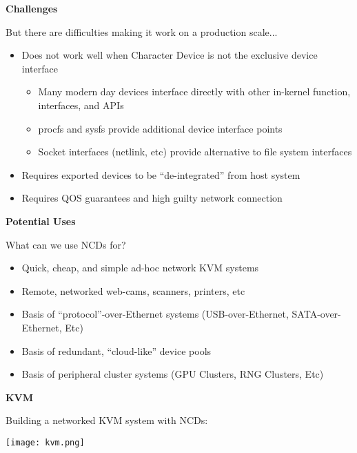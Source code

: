 \documentclass[handout]{beamer}
\begin{document}
\begin{frame}{\bf Challenges}

But there are difficulties making it work on a production scale...

\begin{itemize}
\item<1-> Does not work well when Character Device is not the exclusive
  device interface
  \begin{itemize}
  \item Many modern day devices interface directly with other
    in-kernel function, interfaces, and APIs
  \item procfs and sysfs provide additional device interface points
  \item Socket interfaces (netlink, etc) provide alternative to file
    system interfaces
  \end{itemize}
\item<2-> Requires exported devices to be ``de-integrated'' from host system
\item<3-> Requires QOS guarantees and high guilty network connection
\end{itemize}

\end{frame}

\begin{frame}{\bf Potential Uses}

What can we use NCDs for?

\begin{itemize}
\item<1-> Quick, cheap, and simple ad-hoc network KVM systems
\item<2-> Remote, networked web-cams, scanners, printers, etc
\item<3-> Basis of ``protocol''-over-Ethernet systems (USB-over-Ethernet,
  SATA-over-Ethernet, Etc)
\item<4-> Basis of redundant, ``cloud-like'' device pools
\item<5-> Basis of peripheral cluster systems (GPU Clusters, RNG Clusters,
  Etc)
\end{itemize}

\end{frame}

\begin{frame}{\bf KVM}

Building a networked KVM system with NCDs:

  \begin{center}
    \texttt{[image: kvm.png]}
  \end{center}

\end{frame}
\end{document}
